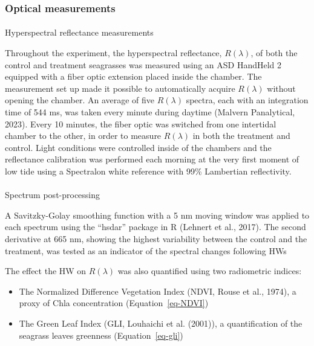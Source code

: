 \documentclass[
  letterpaper,
  11pt,
  english,
  singlespacing,
  headsepline]{MastersDoctoralThesis}
\makeatletter
\let\oldparagraph\paragraph
\renewcommand{\paragraph}{
    \@ifstar
      \xxxParagraphStar
      \xxxParagraphNoStar
  }
\newcommand{\xxxParagraphStar}[1]{\oldparagraph*{#1}\mbox{}}
\newcommand{\xxxParagraphNoStar}[1]{\oldparagraph{#1}\mbox{}}
\makeatother
\begin{document}
\begin{spacing}{1.5}
\begin{figure}
\end{figure}%

\subsubsection{Optical measurements}\label{optical-measurements}

\paragraph{Hyperspectral reflectance
measurements}\label{hyperspectral-reflectance-measurements}

Throughout the experiment, the hyperspectral reflectance,
\(R(\lambda)\), of both the control and treatment seagrasses was
measured using an ASD HandHeld 2 equipped with a fiber optic extension
placed inside the chamber. The measurement set up made it possible to
automatically acquire \(R(\lambda)\) without opening the chamber. An
average of five \(R(\lambda)\) spectra, each with an integration time of
544 ms, was taken every minute during daytime (Malvern Panalytical,
2023). Every 10 minutes, the fiber optic was switched from one
intertidal chamber to the other, in order to measure \(R(\lambda)\) in
both the treatment and control. Light conditions were controlled inside
of the chambers and the reflectance calibration was performed each
morning at the very first moment of low tide using a Spectralon white
reference with 99\% Lambertian reflectivity.

\paragraph{Spectrum post-processing}\label{spectrum-post-processing}

A Savitzky-Golay smoothing function with a 5 nm moving window was
applied to each spectrum using the ``hsdar'' package in R (Lehnert et
al., 2017). The second derivative at 665 nm, showing the highest
variability between the control and the treatment, was tested as an
indicator of the spectral changes following HWs

The effect the HW on \(R(\lambda)\) was also quantified using two
radiometric indices:

\begin{itemize}
\item
  The Normalized Difference Vegetation Index (NDVI, Rouse et al., 1974),
  a proxy of Chla concentration (Equation~\ref{eq-NDVI})
\item
  The Green Leaf Index (GLI, Louhaichi et al. (2001)), a quantification
  of the seagrass leaves greenness (Equation~\ref{eq-gli})
\end{itemize}


\end{spacing}
\end{document}
